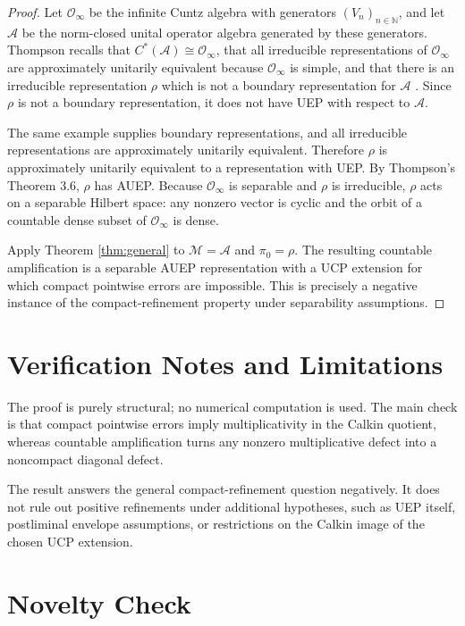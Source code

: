 \documentclass[11pt]{article}
\newcommand{\A}{\mathcal A}
\newcommand{\M}{\mathcal M}
\newcommand{\N}{\mathbb N}
\newcommand{\Oc}{\mathcal O}
\newcommand{\Cstar}{C^*}
\begin{document}
\begin{proof}
Let $\Oc_\infty$ be the infinite Cuntz algebra with generators $(V_n)_{n\in\N}$,
and let $\A$ be the norm-closed unital operator algebra generated by these
generators.  Thompson recalls that $\Cstar(\A)\cong\Oc_\infty$, that all
irreducible representations of $\Oc_\infty$ are approximately unitarily
equivalent because $\Oc_\infty$ is simple, and that there is an irreducible
representation $\rho$ which is not a boundary representation for $\A$
\cite[Example 2]{ThompsonAUEP}.  Since $\rho$ is not a boundary representation,
it does not have UEP with respect to $\A$.

The same example supplies boundary representations, and all irreducible
representations are approximately unitarily equivalent.  Therefore $\rho$ is
approximately unitarily equivalent to a representation with UEP.  By Thompson's
Theorem 3.6, $\rho$ has AUEP.  Because $\Oc_\infty$ is separable and $\rho$ is
irreducible, $\rho$ acts on a separable Hilbert space: any nonzero vector is
cyclic and the orbit of a countable dense subset of $\Oc_\infty$ is dense.

Apply Theorem \ref{thm:general} to $\M=\A$ and $\pi_0=\rho$.  The resulting
countable amplification is a separable AUEP representation with a UCP extension
for which compact pointwise errors are impossible.  This is precisely a negative
instance of the compact-refinement property under separability assumptions.
\end{proof}

\section{Verification Notes and Limitations}

The proof is purely structural; no numerical computation is used.  The main
check is that compact pointwise errors imply multiplicativity in the Calkin
quotient, whereas countable amplification turns any nonzero multiplicative
defect into a noncompact diagonal defect.

The result answers the general compact-refinement question negatively.  It does
not rule out positive refinements under additional hypotheses, such as UEP
itself, postliminal envelope assumptions, or restrictions on the Calkin image of
the chosen UCP extension.

\section{Novelty Check}
\end{document}
